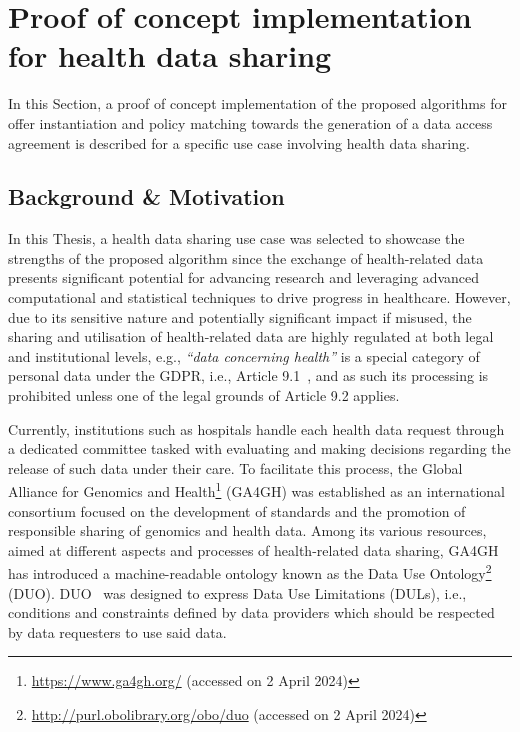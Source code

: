 \section{Proof of concept implementation for health data sharing}
\label{sec:poc_health}

In this Section, a proof of concept implementation of the proposed algorithms for offer instantiation and policy matching towards the generation of a data access agreement is described for a specific use case involving health data sharing.

\subsection{Background \& Motivation}
\label{sec:poc_background}

In this Thesis, a health data sharing use case was selected to showcase the strengths of the proposed algorithm since the exchange of health-related data presents significant potential for advancing research and leveraging advanced computational and statistical techniques to drive progress in healthcare.
However, due to its sensitive nature and potentially significant impact if misused, the sharing and utilisation of health-related data are highly regulated at both legal and institutional levels, e.g., \textit{``data concerning health''} is a special category of personal data under the GDPR, i.e., Article 9.1~\citeyearpar{noauthor_regulation_2016}, and as such its processing is prohibited unless one of the legal grounds of Article 9.2 applies.

Currently, institutions such as hospitals handle each health data request through a dedicated committee tasked with evaluating and making decisions regarding the release of such data under their care.
To facilitate this process, the Global Alliance for Genomics and Health\footnote{\url{https://www.ga4gh.org/} (accessed on 2 April 2024)} (GA4GH) was established as an international consortium focused on the development of standards and the promotion of responsible sharing of genomics and health data.
Among its various resources, aimed at different aspects and processes of health-related data sharing, GA4GH has introduced a machine-readable ontology known as the Data Use Ontology\footnote{\url{http://purl.obolibrary.org/obo/duo} (accessed on 2 April 2024)} (DUO).
DUO~\citep{lawson_data_2021,rehm_ga4gh_2021} was designed to express Data Use Limitations (DULs), i.e., conditions and constraints defined by data providers which should be respected by data requesters to use said data.

